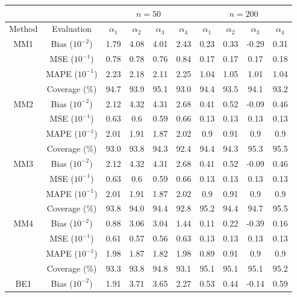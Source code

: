 \begin{table}[htbp]
\centering
\begin{tabular}{c|c|cccc|cccc}
                     &            & \multicolumn{4}{c|}{$n=50$}                       & \multicolumn{4}{c}{$n=200$}                      \\ \hline
Method               & Evaluation & $\alpha_1$ & $\alpha_2$ & $\alpha_3$ & $\alpha_4$ & $\alpha_1$ & $\alpha_2$ & $\alpha_3$ & $\alpha_4$ \\ \hline
\multirow{4}{*}{MM1}& Bias ($10^{-2}$)  & 1.79 & 4.08 & 4.01 & 2.43 & 0.23 & 0.33 & -0.29 & 0.31 \\ 
& MSE ($10^{-1}$)  & 0.78 & 0.78 & 0.76 & 0.84 & 0.17 & 0.17 & 0.17 & 0.18 \\ 
& MAPE ($10^{-1}$)  & 2.23 & 2.18 & 2.11 & 2.25 & 1.04 & 1.05 & 1.01 & 1.04 \\ 
& Coverage (\%)  & 94.7 & 93.9 & 95.1 & 93.0 & 94.4 & 93.5 & 94.1 & 93.2 \\ 
\hline 
\multirow{4}{*}{MM2}& Bias ($10^{-2}$)  & 2.12 & 4.32 & 4.31 & 2.68 & 0.41 & 0.52 & -0.09 & 0.46 \\ 
& MSE ($10^{-1}$)  & 0.63 & 0.6 & 0.59 & 0.66 & 0.13 & 0.13 & 0.13 & 0.13 \\ 
& MAPE ($10^{-1}$)  & 2.01 & 1.91 & 1.87 & 2.02 & 0.9 & 0.91 & 0.9 & 0.9 \\ 
& Coverage (\%)  & 93.0 & 93.8 & 94.3 & 92.4 & 94.4 & 94.3 & 95.3 & 95.5 \\ 
\hline 
\multirow{4}{*}{MM3}& Bias ($10^{-2}$)  & 2.12 & 4.32 & 4.31 & 2.68 & 0.41 & 0.52 & -0.09 & 0.46 \\ 
& MSE ($10^{-1}$)  & 0.63 & 0.6 & 0.59 & 0.66 & 0.13 & 0.13 & 0.13 & 0.13 \\ 
& MAPE ($10^{-1}$)  & 2.01 & 1.91 & 1.87 & 2.02 & 0.9 & 0.91 & 0.9 & 0.9 \\ 
& Coverage (\%)  & 93.8 & 94.0 & 94.4 & 92.8 & 95.2 & 94.4 & 94.7 & 95.5 \\ 
\hline 
\multirow{4}{*}{MM4}& Bias ($10^{-2}$)  & 0.88 & 3.06 & 3.04 & 1.44 & 0.11 & 0.22 & -0.39 & 0.16 \\ 
& MSE ($10^{-1}$)  & 0.61 & 0.57 & 0.56 & 0.63 & 0.13 & 0.13 & 0.13 & 0.13 \\ 
& MAPE ($10^{-1}$)  & 1.98 & 1.87 & 1.82 & 1.98 & 0.89 & 0.91 & 0.9 & 0.9 \\ 
& Coverage (\%)  & 93.3 & 93.8 & 94.8 & 93.1 & 95.1 & 95.1 & 95.1 & 95.2 \\ 
\hline 
\multirow{4}{*}{BE1}& Bias ($10^{-2}$)  & 1.91 & 3.71 & 3.65 & 2.27 & 0.53 & 0.44 & -0.14 & 0.59 \\ 

\end{tabular}
\end{table}
